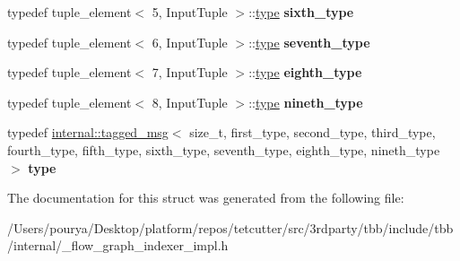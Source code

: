 \begin{DoxyCompactItemize}
\item 
\hypertarget{structinternal_1_1input__types_3_019_00_01InputTuple_01_4_a8f617067b5f4d5914876780eb6e9d3bf}{}typedef tuple\+\_\+element$<$ 5, Input\+Tuple $>$\+::\hyperlink{classinternal_1_1tagged__msg}{type} {\bfseries sixth\+\_\+type}\label{structinternal_1_1input__types_3_019_00_01InputTuple_01_4_a8f617067b5f4d5914876780eb6e9d3bf}

\item 
\hypertarget{structinternal_1_1input__types_3_019_00_01InputTuple_01_4_a7ee91539bb1f00359fd422bce60f8d64}{}typedef tuple\+\_\+element$<$ 6, Input\+Tuple $>$\+::\hyperlink{classinternal_1_1tagged__msg}{type} {\bfseries seventh\+\_\+type}\label{structinternal_1_1input__types_3_019_00_01InputTuple_01_4_a7ee91539bb1f00359fd422bce60f8d64}

\item 
\hypertarget{structinternal_1_1input__types_3_019_00_01InputTuple_01_4_af1d7f899e615def9766522deb17ad665}{}typedef tuple\+\_\+element$<$ 7, Input\+Tuple $>$\+::\hyperlink{classinternal_1_1tagged__msg}{type} {\bfseries eighth\+\_\+type}\label{structinternal_1_1input__types_3_019_00_01InputTuple_01_4_af1d7f899e615def9766522deb17ad665}

\item 
\hypertarget{structinternal_1_1input__types_3_019_00_01InputTuple_01_4_a56449fbad53ef36f72c6327660fdfe7e}{}typedef tuple\+\_\+element$<$ 8, Input\+Tuple $>$\+::\hyperlink{classinternal_1_1tagged__msg}{type} {\bfseries nineth\+\_\+type}\label{structinternal_1_1input__types_3_019_00_01InputTuple_01_4_a56449fbad53ef36f72c6327660fdfe7e}

\item 
\hypertarget{structinternal_1_1input__types_3_019_00_01InputTuple_01_4_aa0ca3be7319934f6320d88125e68d5e4}{}typedef \hyperlink{classinternal_1_1tagged__msg}{internal\+::tagged\+\_\+msg}$<$ size\+\_\+t, first\+\_\+type, second\+\_\+type, third\+\_\+type, fourth\+\_\+type, fifth\+\_\+type, sixth\+\_\+type, seventh\+\_\+type, eighth\+\_\+type, nineth\+\_\+type $>$ {\bfseries type}\label{structinternal_1_1input__types_3_019_00_01InputTuple_01_4_aa0ca3be7319934f6320d88125e68d5e4}

\end{DoxyCompactItemize}


The documentation for this struct was generated from the following file\+:\begin{DoxyCompactItemize}
\item 
/\+Users/pourya/\+Desktop/platform/repos/tetcutter/src/3rdparty/tbb/include/tbb/internal/\+\_\+flow\+\_\+graph\+\_\+indexer\+\_\+impl.\+h\end{DoxyCompactItemize}
